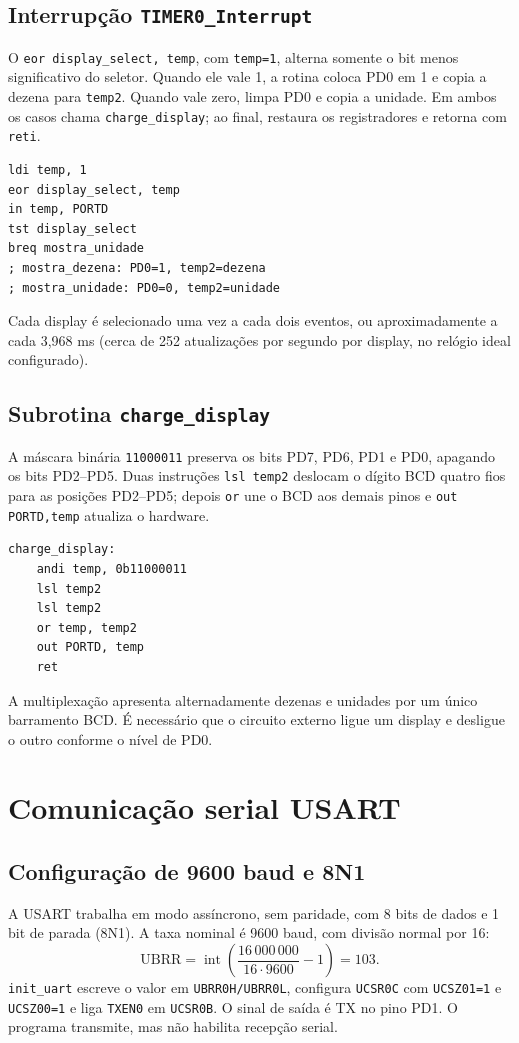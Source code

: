 \documentclass[12pt,a4paper]{article}
\newcommand{\reg}[1]{\texttt{#1}}
\newcommand{\subrot}[1]{\texttt{#1}}
\begin{document}
\subsection{Interrupção \texttt{TIMER0\_Interrupt}}
O \reg{eor display\_select, temp}, com \reg{temp=1}, alterna somente o bit menos significativo do seletor. Quando ele vale 1, a rotina coloca PD0 em 1 e copia a dezena para \reg{temp2}. Quando vale zero, limpa PD0 e copia a unidade. Em ambos os casos chama \subrot{charge\_display}; ao final, restaura os registradores e retorna com \reg{reti}.
\begin{lstlisting}
ldi temp, 1
eor display_select, temp
in temp, PORTD
tst display_select
breq mostra_unidade
; mostra_dezena: PD0=1, temp2=dezena
; mostra_unidade: PD0=0, temp2=unidade
\end{lstlisting}
Cada display é selecionado uma vez a cada dois eventos, ou aproximadamente a cada 3,968 ms (cerca de 252 atualizações por segundo por display, no relógio ideal configurado).

\subsection{Subrotina \texttt{charge\_display}}
A máscara binária \reg{11000011} preserva os bits PD7, PD6, PD1 e PD0, apagando os bits PD2--PD5. Duas instruções \reg{lsl temp2} deslocam o dígito BCD quatro fios para as posições PD2--PD5; depois \reg{or} une o BCD aos demais pinos e \reg{out PORTD,temp} atualiza o hardware.
\begin{lstlisting}
charge_display:
    andi temp, 0b11000011
    lsl temp2
    lsl temp2
    or temp, temp2
    out PORTD, temp
    ret
\end{lstlisting}
A multiplexação apresenta alternadamente dezenas e unidades por um único barramento BCD. É necessário que o circuito externo ligue um display e desligue o outro conforme o nível de PD0.

\section{Comunicação serial USART}
\subsection{Configuração de 9600 baud e 8N1}
A USART trabalha em modo assíncrono, sem paridade, com 8 bits de dados e 1 bit de parada (8N1). A taxa nominal é 9600 baud, com divisão normal por 16:
\[
\mathrm{UBRR}=\operatorname{int}\left(\frac{16\,000\,000}{16\cdot9600}-1\right)=103.
\]
\reg{init\_uart} escreve o valor em \reg{UBRR0H/UBRR0L}, configura \reg{UCSR0C} com \reg{UCSZ01=1} e \reg{UCSZ00=1} e liga \reg{TXEN0} em \reg{UCSR0B}. O sinal de saída é TX no pino PD1. O programa transmite, mas não habilita recepção serial.
\end{document}
